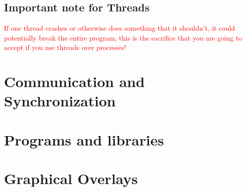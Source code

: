 \documentclass[main.tex,fontsize=8pt,paper=a4,paper=portrait,DIV=calc,]{scrartcl}
\begin{document}
\subsection{Important note for Threads}
\textcolor{red}{If one thread crashes or otherwise does something that it shouldn't, it could potentially break the entire program, this is the sacrifice that you are going to accept if you use threads over processes!}


\section{Communication and Synchronization}

\section{Programs and libraries}

\section{Graphical Overlays}
\end{document}
